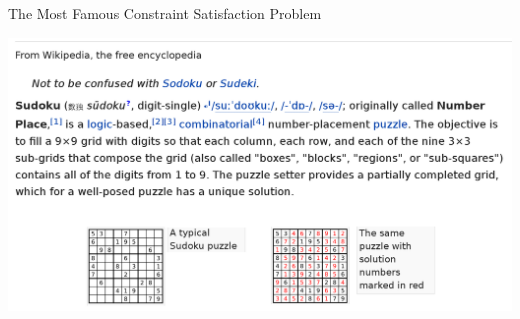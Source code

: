 \documentclass[aspectratio=169,compress,10pt]{beamer}
\begin{document}
\begin{frame}{The Most Famous Constraint Satisfaction Problem}
    \begin{center}\includegraphics[scale=0.18]{sudoku.png}\end{center}
\end{frame}

\newcommand{\truck}[1]{\raisebox{-2pt}{
    \begin{tikzpicture}[scale=0.5, inner sep=0pt, outer sep=0pt]
        \path[fill=uofgsandstone] (0.9525, -0.7144).. controls (0.9525, -0.7728) and (0.9051, -0.8202) .. (0.8467, -0.8202) -- (0.1058, -0.8202).. controls (0.0474, -0.8202) and (0.0, -0.7728) .. (0.0, -0.7144) -- (0.0, -0.635).. controls (0.0, -0.5766) and (0.0474, -0.5292) .. (0.1058, -0.5292) -- (0.8467, -0.5292).. controls (0.9051, -0.5292) and (0.9525, -0.5766) .. (0.9525, -0.635) -- (0.9525, -0.7144) -- cycle;
        \path[fill=uofgsandstone!60!white] (0.5027, -0.344) -- (0.4768, -0.3175) -- (0.1891, -0.3175).. controls (0.1058, -0.3175) and (0.0794, -0.3704) .. (0.0794, -0.3704) -- (0.0, -0.5281) -- (0.0, -0.6615) -- (0.5027, -0.6615) -- (0.5027, -0.344) -- cycle;
        \path[fill=uofgsandstone!40!white] (0.2381, -0.5292) -- (0.0529, -0.5292) -- (0.1058, -0.4233) -- (0.2381, -0.3704) -- (0.2381, -0.5292) -- cycle;
        \path[fill=uofgsandstone!40!white] (0.2381, -0.8202) circle (0.1058cm);
        \path[fill=black] (0.2381, -0.8202) circle (0.0529cm);
        \path[fill=uofgsandstone!40!white] (0.7144, -0.8202) circle (0.1058cm);
        \path[fill=black] (0.7144, -0.8202) circle (0.0529cm);
        \path[fill=#1] (0.8467, -0.2117) -- (0.4498, -0.2117).. controls (0.3913, -0.2117) and (0.344, -0.2591) .. (0.344, -0.3175) -- (0.344, -0.6615) -- (0.9525, -0.6615) -- (0.9525, -0.3175).. controls (0.9525, -0.2591) and (0.9051, -0.2117) .. (0.8467, -0.2117) -- cycle;
    \end{tikzpicture}}
}
\end{document}
